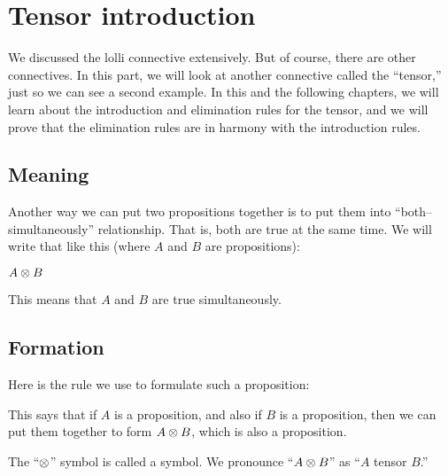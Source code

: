 \documentclass[../../../main.tex]{subfiles}
\begin{document}
\chapter{Tensor introduction}

We discussed the lolli connective extensively. But of course, there are other connectives. In this part, we will look at another connective called the ``tensor,'' just so we can see a second example. In this and the following chapters, we will learn about the introduction and elimination rules for the tensor, and we will prove that the elimination rules are in harmony with the introduction rules.


\section{Meaning}

Another way we can put two propositions together is to put them into ``both--simultaneously'' relationship. That is, both are true at the same time. We will write that like this (where $A$ and $B$ are propositions):

\begin{center}
  $A \tensor/ B$
\end{center}

\noindent
This means that $A$ and $B$ are true simultaneously.



\section{Formation}

Here is the rule we use to formulate such a proposition:

\begin{prooftree*}
\end{prooftree*}

\noindent
This says that if $A$ is a proposition, and also if $B$ is a proposition, then we can put them together to form $A \tensor/ B$, which is also a proposition.

The ``$\tensor/$'' symbol is called a  symbol. We pronounce ``$A \tensor/ B$'' as ``$A$ tensor $B$.''
\end{document}

